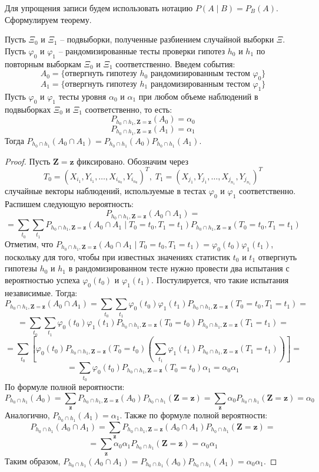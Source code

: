 Для упрощения записи будем использовать нотацию 
$P(A \mid B)=P_{B}(A)$. Сформулируем теорему.
\begin{theorem}\label{main_theorem}
    Пусть $\Xi_0$ и $\Xi_1$ -- подвыборки, полученные разбиением случайной выборки $\Xi$.
    Пусть $\varphi_0$ и $\varphi_1$ -- рандомизированные тесты 
    проверки гипотез $h_0$ и $h_1$ по повторным выборкам 
    $\Xi_0$ и $\Xi_1$ соответственно.
    Введем события:
    $$A_0 = \{\text{отвергнуть гипотезу $h_0$ рандомизированным тестом $\varphi_0$}\}$$ 
    $$A_1 = \{\text{отвергнуть гипотезу $h_1$ рандомизированным тестом $\varphi_1$}\}$$
    Пусть $\varphi_0$ и $\varphi_1$ тесты уровня $\alpha_0$ и $\alpha_1$
    при любом объеме наблюдений в подвыборках $\Xi_0$ и $\Xi_1$ соответственно, то есть:
    $$P_{h_0\cap h_1,\mathbf{Z=z}}(A_0)=\alpha_0$$ 
    $$P_{h_0\cap h_1,\mathbf{Z=z}}(A_1)=\alpha_1$$
    Тогда $P_{h_0\cap h_1}(A_0 \cap A_1)= P_{h_0\cap h_1}(A_0) P_{h_0\cap h_1}(A_1)$.
\end{theorem}
\begin{proof}
    Пусть $\mathbf{Z}=\mathbf{z}$ фиксировано. 
    Обозначим через
    $$T_0=(X_{i_1},Y_{i_1},\ldots,X_{i_{n_0}},Y_{i_{n_0}})^T, \;
    T_1=(X_{j_1},Y_{j_1},\ldots,X_{j_{n_1}},Y_{j_{n_1}})^T$$
    случайные векторы наблюдений, используемые в тестах $\varphi_0$ и 
    $\varphi_1$ соответственно.
    Распишем следующую вероятность:
    $$
    P_{h_0\cap h_1,\mathbf{Z=z}}(A_0 \cap A_1)=
    $$
    $$
    =\sum_{t_0}\sum_{t_1} P_{h_0\cap h_1,\mathbf{Z=z}}(A_0 \cap A_1 \mid T_0=t_0, T_1=t_1)P_{h_0\cap h_1,\mathbf{Z=z}}(T_0=t_0, T_1=t_1)
    $$
    Отметим, что $P_{h_0\cap h_1,\mathbf{Z=z}}(A_0 \cap A_1 \mid T_0=t_0, T_1=t_1)=\varphi_0(t_0)\varphi_1(t_1)$, поскольку
    для того, чтобы при известных значениях статистик $t_0$ и $t_1$ отвергнуть гипотезы $h_0$ и $h_1$ в рандомизированном тесте нужно провести два испытания с вероятностью успеха
    $\varphi_0(t_0)$ и $\varphi_1(t_1)$. Постулируется, что такие испытания независимые. Тогда:
    $$
    P_{h_0\cap h_1,\mathbf{Z=z}}(A_0 \cap A_1)=\sum_{t_0}\sum_{t_1} \varphi_0(t_0) \varphi_1(t_1) P_{h_0\cap h_1,\mathbf{Z=z}}(T_0=t_0, T_1=t_1)=
    $$
    $$
    =\sum_{t_0}\sum_{t_1} \varphi_0(t_0) \varphi_1(t_1) P_{h_0\cap h_1,\mathbf{Z=z}}(T_0=t_0)P_{h_0\cap h_1,\mathbf{Z=z}}(T_1=t_1)=
    $$
    $$
    =\sum_{t_0}\left[ \varphi_0(t_0) P_{h_0\cap h_1,\mathbf{Z=z}}(T_0=t_0) \left(\sum_{t_1}\varphi_1(t_1) P_{h_0\cap h_1,\mathbf{Z=z}}(T_1=t_1)\right)\right]=
    $$
    $$
    = \sum_{t_0} \varphi_0(t_0) P_{h_0\cap h_1,\mathbf{Z=z}}(T_0=t_0) \alpha_1 
    =\alpha_0 \alpha_1
    $$
    По формуле полной вероятности:
    $$
    P_{h_0\cap h_1}(A_0) = \sum_{\mathbf{z}} P_{h_0\cap h_1,\mathbf{Z=z}}(A_0) P_{h_0\cap h_1}(\mathbf{Z}=\mathbf{z})
    = \sum_{\mathbf{z}} \alpha_0 P_{h_0\cap h_1}(\mathbf{Z}=\mathbf{z})=\alpha_0
    $$
    Аналогично, $P_{h_0\cap h_1}(A_1)=\alpha_1$. Также по формуле полной вероятности:
    $$
    P_{h_0\cap h_1}(A_0 \cap A_1) = \sum_{\mathbf{z}} P_{h_0\cap h_1,\mathbf{Z=z}}(A_0 \cap A_1) P_{h_0\cap h_1}(\mathbf{Z}=\mathbf{z})=
    $$
    $$
    = \sum_{\mathbf{z}} \alpha_0 \alpha_1 P_{h_0\cap h_1}(\mathbf{Z}=\mathbf{z})
    = \alpha_0 \alpha_1
    $$
    Таким образом, $P_{h_0\cap h_1}(A_0 \cap A_1)=P_{h_0\cap h_1}(A_0) P_{h_0\cap h_1}(A_1)=\alpha_0 \alpha_1$.
\end{proof}
